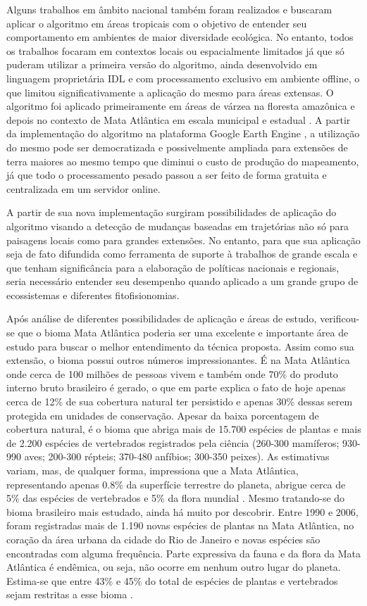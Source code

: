 Alguns trabalhos em âmbito nacional também foram realizados e buscaram aplicar o algoritmo em áreas tropicais com o objetivo de entender seu comportamento em ambientes de maior diversidade ecológica. No entanto, todos os trabalhos focaram em contextos locais ou espacialmente limitados já que só puderam utilizar a primeira versão do algoritmo, ainda desenvolvido em linguagem proprietária IDL e com processamento exclusivo em ambiente offline, o que limitou significativamente a aplicação do mesmo para áreas extensas. O algoritmo foi aplicado primeiramente em áreas de várzea na floresta amazônica \citep{FRAGAL2016} e depois no contexto de Mata Atlântica em escala municipal \citep{Zebende2020} e estadual \citep{Weckmuller2019}. A partir da implementação do algoritmo na plataforma Google Earth Engine \citep{Kennedy2018}, a utilização do mesmo pode ser democratizada e possivelmente ampliada para extensões de terra maiores ao mesmo tempo que diminui o custo de produção do mapeamento, já que todo o processamento pesado passou a ser feito de forma gratuita e centralizada em um servidor online.

A partir de sua nova implementação surgiram possibilidades de aplicação do algoritmo visando a detecção de mudanças baseadas em trajetórias não só para paisagens locais como para grandes extensões. No entanto, para que sua aplicação seja de fato difundida como ferramenta de suporte à trabalhos de grande escala e que tenham significância para a elaboração de políticas nacionais e regionais, seria necessário entender seu desempenho quando aplicado a um grande grupo de ecossistemas e diferentes fitofisionomias.

Após análise de diferentes possibilidades de aplicação e áreas de estudo, verificou-se que o bioma Mata Atlântica poderia ser uma excelente e importante área de estudo para buscar o melhor entendimento da técnica proposta. Assim como sua extensão, o bioma possui outros números impressionantes. É na Mata Atlântica onde cerca de 100 milhões de pessoas vivem e também onde 70\% do produto interno bruto brasileiro é gerado, o que em parte explica o fato de hoje apenas cerca de 12\% de sua cobertura natural ter persistido e apenas 30\% dessas serem protegida em unidades de conservação. Apesar da baixa porcentagem de cobertura natural, é o bioma que abriga mais de 15.700 espécies de plantas e mais de 2.200 espécies de vertebrados registrados pela ciência (260-300 mamíferos; 930-990 aves; 200-300 répteis; 370-480 anfíbios; 300-350 peixes). As estimativas variam, mas, de qualquer forma, impressiona que a Mata Atlântica, representando apenas 0.8\% da superfície terrestre do planeta, abrigue cerca de 5\% das espécies de vertebrados e 5\% da flora mundial \citep{scarano2014}. Mesmo tratando-se do bioma brasileiro mais estudado, ainda há muito por descobrir. Entre 1990 e 2006, foram registradas mais de 1.190 novas espécies de plantas na Mata Atlântica, no coração da área urbana da cidade do Rio de Janeiro e novas espécies são encontradas com alguma frequência. Parte expressiva da fauna e da flora da Mata Atlântica é endêmica, ou seja, não ocorre em nenhum outro lugar do planeta. Estima-se que entre 43\% e 45\% do total de espécies de plantas e vertebrados sejam restritas a esse bioma \citep{scarano2014}.

